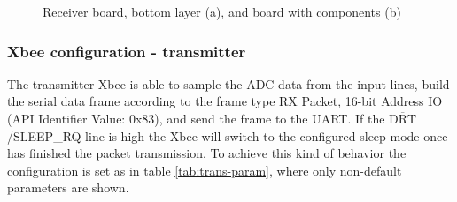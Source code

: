 \documentclass[11pt,english]{article}
\newcommand{\textoverline}[1]{$\overline{\mbox{#1}}$}
\begin{document}
\begin{figure}[H]%
    \centering
    \qquad
    \caption{Receiver board, bottom layer (a), and board with components (b)}%
    \label{fig:board-trans-comp}%
\end{figure}

\subsubsection{Xbee configuration - transmitter}\label{subsec:hd-xbee_config_trans}

The transmitter Xbee is able to sample the ADC data from the input lines, build the serial data frame according to the 
frame type RX Packet, 16-bit Address IO (API Identifier Value: 0x83), and send the frame to the UART. If the 
\textoverline{DRT}/SLEEP\_RQ line is high the Xbee will switch to the configured sleep mode once has finished the packet 
transmission. To achieve this kind of behavior the configuration is set as in table \ref{tab:trans-param}, where only non-default 
parameters are shown.
\end{document}
